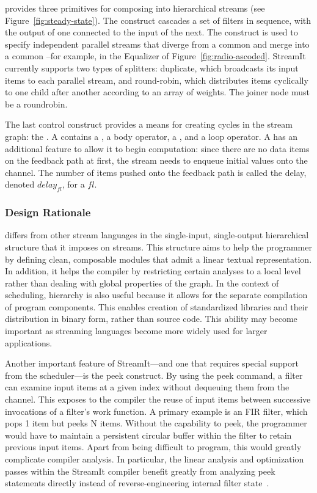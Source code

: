 {\StreamIt} provides three primitives for composing {\filters} into
hierarchical streams (see Figure~\ref{fig:steady-state}).  The
{\pipeline} construct cascades a set of filters in sequence, with the
output of one connected to the input of the next.  The {\splitjoin}
construct is used to specify independent parallel streams that diverge
from a common {\splitter} and merge into a common {\joiner}--for
example, in the Equalizer of Figure~\ref{fig:radio-ascoded}.  StreamIt
currently supports two types of splitters: duplicate, which broadcasts
its input items to each parallel stream, and round-robin, which
distributes items cyclically to one child after another according to
an array of weights.  The joiner node must be a roundrobin.

The last control construct provides a means for creating cycles in the
stream graph: the {\feedbackloop}. A {\feedbackloop} contains a
{\joiner}, a body operator, a {\splitter}, and a loop operator.  A
{\feedbackloop} has an additional feature to allow it to begin
computation: since there are no data items on the feedback path at
first, the stream needs to enqueue initial values onto the channel.
The number of items pushed onto the feedback path is called the delay,
denoted $delay_{fl}$, for a {\feedbackloop} $fl$.

\subsubsection{Design Rationale}

{\StreamIt} differs from other stream languages in the single-input,
single-output hierarchical structure that it imposes on streams.  This
structure aims to help the programmer by defining clean, composable
modules that admit a linear textual representation.  In addition, it
helps the compiler by restricting certain analyses to a local level
rather than dealing with global properties of the graph.  In the
context of scheduling, hierarchy is also useful because it allows for
the separate compilation of program components.  This enables
creation of standardized libraries and their distribution in binary
form, rather than source code.  This ability may become important as
streaming languages become more widely used for larger applications.

Another important feature of StreamIt---and one that requires special
support from the scheduler---is the peek construct.  By using the peek
command, a filter can examine input items at a given index without
dequeuing them from the channel.  This exposes to the compiler the
reuse of input items between successive invocations of a filter's work
function.  A primary example is an FIR filter, which pops 1 item but
peeks N items.  Without the capability to peek, the programmer would
have to maintain a persistent circular buffer within the filter to
retain previous input items.  Apart from being difficult to program,
this would greatly complicate compiler analysis.  In particular, the
linear analysis and optimization passes within the StreamIt compiler
benefit greatly from analyzing peek statements directly instead of
reverse-engineering internal filter state~\cite{lamb03}.

